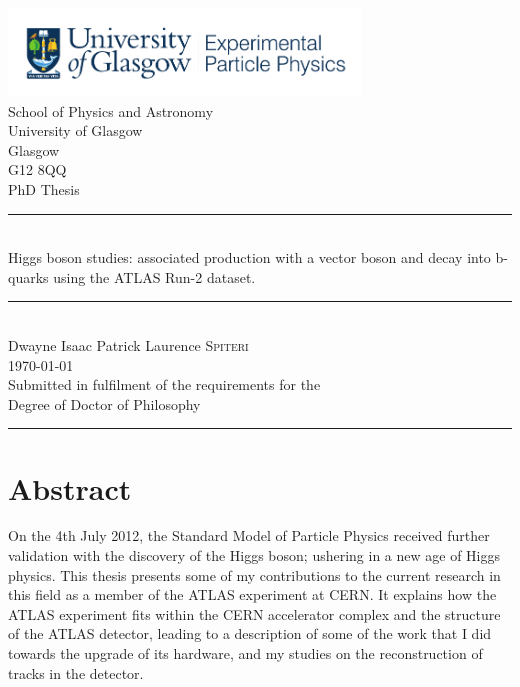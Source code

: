 \documentclass[12pt,titlepage,oneside]{book}
\newcommand{\SM}{Standard Model }
\begin{document}


\thispagestyle{empty}%

	\begin{center} %
	\includegraphics[width=0.7\textwidth]{ExperPartPhys_colour.pdf}~\\[4mm]%
	School of Physics and Astronomy\\
	University of Glasgow\\
	Glasgow\\
	G12 8QQ\\[8mm] %

    {\Large PhD Thesis}
	\rule[0.4cm]{15cm}{.2pt}\\ %

	{\Huge Higgs boson studies:}
	{\Huge associated production with a vector boson and decay into b-quarks using the ATLAS Run-2 dataset.}\\[1cm] %
	\rule[0.4cm]{15cm}{.2pt}\\[4cm] %
	{\LARGE Dwayne Isaac Patrick Laurence \textsc{Spiteri}}\\[1cm] %
	{\small \today}\\[1cm] %
	{\small 
		Submitted in fulfilment of the requirements for the\\
		Degree of Doctor of Philosophy}\\[1cm] %
	\rule[0.4cm]{15cm}{.2pt} 
	\end{center}

\pagestyle{plain} %
\frontmatter  %

\chapter{Abstract}
On the 4th July 2012, the \SM of Particle Physics received further validation with the discovery of the Higgs boson; ushering in a new age of Higgs physics. This thesis presents some of my contributions to the current research in this field as a member of the ATLAS experiment at CERN. It explains how the ATLAS experiment fits within the CERN accelerator complex and the structure of the ATLAS detector, leading to a description of some of the work that I did towards the upgrade of its hardware, and my studies on the reconstruction of tracks in the detector.\\
\end{document}

